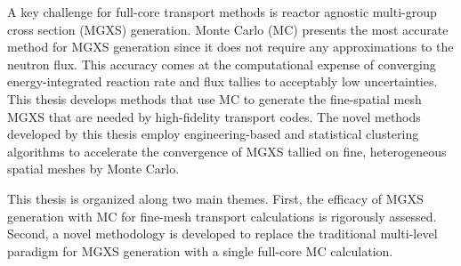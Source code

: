 \begin{abstractpage}

A key challenge for full-core transport methods is reactor agnostic multi-group cross section (MGXS) generation. Monte Carlo (MC) presents the most accurate method for MGXS generation since it does not require any approximations to the neutron flux. This accuracy comes at the computational expense of converging energy-integrated reaction rate and flux tallies to acceptably low uncertainties. This thesis develops methods that use MC to generate the fine-spatial mesh MGXS that are needed by high-fidelity transport codes. The novel methods developed by this thesis employ engineering-based and statistical clustering algorithms to accelerate the convergence of MGXS tallied on fine, heterogeneous spatial meshes by Monte Carlo.




This thesis is organized along two main themes. First, the efficacy of MGXS generation with MC for fine-mesh transport calculations is rigorously assessed. Second, a novel methodology is developed to replace the traditional multi-level paradigm for MGXS generation with a single full-core MC calculation. 


\end{abstractpage}
